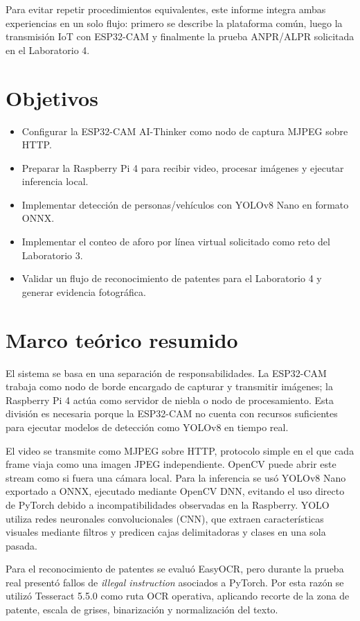 \documentclass[12pt, letterpaper]{article}
\begin{document}
Para evitar repetir procedimientos equivalentes, este informe integra ambas experiencias en un solo flujo: primero se describe la plataforma común, luego la transmisión IoT con ESP32-CAM y finalmente la prueba ANPR/ALPR solicitada en el Laboratorio 4.

\section{Objetivos}

\begin{itemize}
    \item Configurar la ESP32-CAM AI-Thinker como nodo de captura MJPEG sobre HTTP.
    \item Preparar la Raspberry Pi 4 para recibir video, procesar imágenes y ejecutar inferencia local.
    \item Implementar detección de personas/vehículos con YOLOv8 Nano en formato ONNX.
    \item Implementar el conteo de aforo por línea virtual solicitado como reto del Laboratorio 3.
    \item Validar un flujo de reconocimiento de patentes para el Laboratorio 4 y generar evidencia fotográfica.
\end{itemize}

\section{Marco teórico resumido}

El sistema se basa en una separación de responsabilidades. La ESP32-CAM trabaja como nodo de borde encargado de capturar y transmitir imágenes; la Raspberry Pi 4 actúa como servidor de niebla o nodo de procesamiento. Esta división es necesaria porque la ESP32-CAM no cuenta con recursos suficientes para ejecutar modelos de detección como YOLOv8 en tiempo real.

El video se transmite como MJPEG sobre HTTP, protocolo simple en el que cada frame viaja como una imagen JPEG independiente. OpenCV puede abrir este stream como si fuera una cámara local. Para la inferencia se usó YOLOv8 Nano exportado a ONNX, ejecutado mediante OpenCV DNN, evitando el uso directo de PyTorch debido a incompatibilidades observadas en la Raspberry. YOLO utiliza redes neuronales convolucionales (CNN), que extraen características visuales mediante filtros y predicen cajas delimitadoras y clases en una sola pasada.

Para el reconocimiento de patentes se evaluó EasyOCR, pero durante la prueba real presentó fallos de \textit{illegal instruction} asociados a PyTorch. Por esta razón se utilizó Tesseract 5.5.0 como ruta OCR operativa, aplicando recorte de la zona de patente, escala de grises, binarización y normalización del texto.
\end{document}
